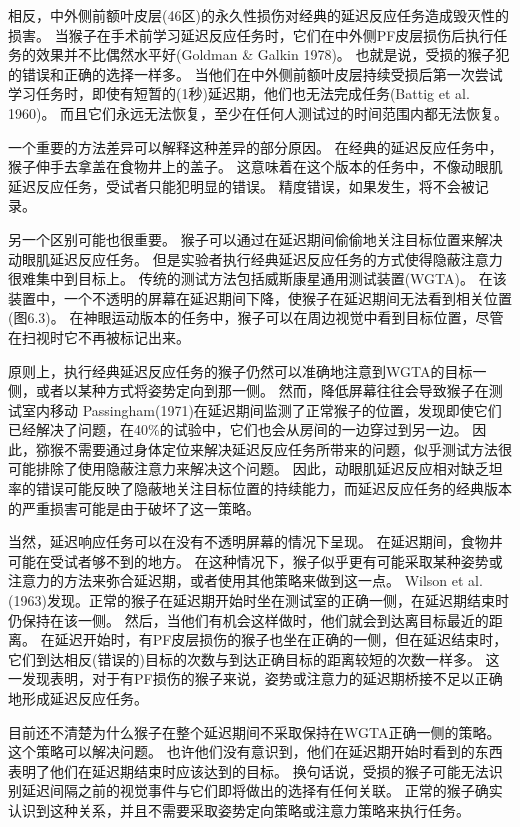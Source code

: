 相反，中外侧前额叶皮层(46区)的永久性损伤对经典的延迟反应任务造成毁灭性的损害。
当猴子在手术前学习延迟反应任务时，它们在中外侧PF皮层损伤后执行任务的效果并不比偶然水平好(Goldman \& Galkin 1978)。
也就是说，受损的猴子犯的错误和正确的选择一样多。
当他们在中外侧前额叶皮层持续受损后第一次尝试学习任务时，即使有短暂的(1秒)延迟期，他们也无法完成任务(Battig et al. 1960)。
而且它们永远无法恢复，至少在任何人测试过的时间范围内都无法恢复。


一个重要的方法差异可以解释这种差异的部分原因。
在经典的延迟反应任务中，猴子伸手去拿盖在食物井上的盖子。
这意味着在这个版本的任务中，不像动眼肌延迟反应任务，受试者只能犯明显的错误。
精度错误，如果发生，将不会被记录。


另一个区别可能也很重要。
猴子可以通过在延迟期间偷偷地关注目标位置来解决动眼肌延迟反应任务。
但是实验者执行经典延迟反应任务的方式使得隐蔽注意力很难集中到目标上。
传统的测试方法包括威斯康星通用测试装置(WGTA)。
在该装置中，一个不透明的屏幕在延迟期间下降，使猴子在延迟期间无法看到相关位置(图6.3)。
在神眼运动版本的任务中，猴子可以在周边视觉中看到目标位置，尽管在扫视时它不再被标记出来。


原则上，执行经典延迟反应任务的猴子仍然可以准确地注意到WGTA的目标一侧，或者以某种方式将姿势定向到那一侧。
然而，降低屏幕往往会导致猴子在测试室内移动
Passingham(1971)在延迟期间监测了正常猴子的位置，发现即使它们已经解决了问题，在40\%的试验中，它们也会从房间的一边穿过到另一边。
因此，猕猴不需要通过身体定位来解决延迟反应任务所带来的问题，似乎测试方法很可能排除了使用隐蔽注意力来解决这个问题。
因此，动眼肌延迟反应相对缺乏坦率的错误可能反映了隐蔽地关注目标位置的持续能力，而延迟反应任务的经典版本的严重损害可能是由于破坏了这一策略。


当然，延迟响应任务可以在没有不透明屏幕的情况下呈现。
在延迟期间，食物井可能在受试者够不到的地方。
在这种情况下，猴子似乎更有可能采取某种姿势或注意力的方法来弥合延迟期，或者使用其他策略来做到这一点。
Wilson et al.(1963)发现。正常的猴子在延迟期开始时坐在测试室的正确一侧，在延迟期结束时仍保持在该一侧。
然后，当他们有机会这样做时，他们就会到达离目标最近的距离。
在延迟开始时，有PF皮层损伤的猴子也坐在正确的一侧，但在延迟结束时，它们到达相反(错误的)目标的次数与到达正确目标的距离较短的次数一样多。
这一发现表明，对于有PF损伤的猴子来说，姿势或注意力的延迟期桥接不足以正确地形成延迟反应任务。


目前还不清楚为什么猴子在整个延迟期间不采取保持在WGTA正确一侧的策略。
这个策略可以解决问题。
也许他们没有意识到，他们在延迟期开始时看到的东西表明了他们在延迟期结束时应该达到的目标。
换句话说，受损的猴子可能无法识别延迟间隔之前的视觉事件与它们即将做出的选择有任何关联。
正常的猴子确实认识到这种关系，并且不需要采取姿势定向策略或注意力策略来执行任务。


